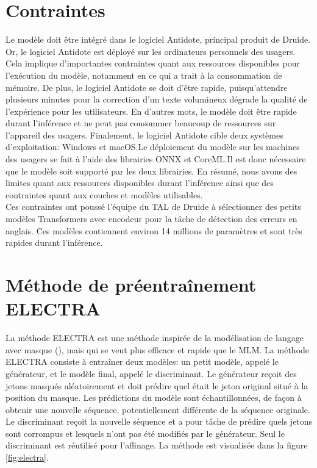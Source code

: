 \documentclass[12pt,twoside,rapport]{dms}
\theoremstyle{definition}
\numberwithin{equation}{section}
\numberwithin{table}{chapter}
\numberwithin{figure}{chapter}
\begin{document}
\section{Contraintes}
Le modèle doit être intégré dans le logiciel Antidote, principal produit de
Druide. Or, le logiciel Antidote est déployé sur les ordinateurs personnels des
usagers. Cela implique d'importantes contraintes quant aux ressources
disponibles pour l'exécution du modèle, notamment en ce qui a trait à la
consommation de mémoire. De plus, le logiciel Antidote se doit d'être rapide,
puisqu'attendre plusieurs minutes pour la correction d'un texte volumineux
dégrade la qualité de l'expérience pour les utilisateurs. En d'autres mots, le
modèle doit être rapide durant l'inférence et ne peut pas consommer beaucoup de
ressources sur l'appareil des usagers. Finalement, le logiciel Antidote cible
deux systèmes d'exploitation: Windows et macOS.\@ Le déploiement du modèle sur
les machines des usagers se fait à l'aide des librairies ONNX\cite{onnxruntime}
et CoreML.\@ Il est donc nécessaire que le modèle soit supporté par les deux
librairies. En résumé, nous avons des limites quant aux ressources disponibles
durant l'inférence ainsi que des contraintes quant aux couches et modèles
utilisables.\\

Ces contraintes ont poussé l'équipe du TAL de Druide à sélectionner des petits
modèles Transformers\cite{vaswani2023attentionneed} avec encodeur pour la tâche
de détection des erreurs en anglais. Ces modèles contiennent environ 14
millions de paramètres et sont très rapides durant l'inférence.

\section{Méthode de préentraînement ELECTRA}

La méthode ELECTRA\cite{clark2020electrapretrainingtextencoders} est une
méthode inspirée de la modélisation de langage avec masque (), mais
qui se veut plus efficace et rapide que le MLM. La méthode ELECTRA consiste à
entraîner deux modèles: un petit modèle, appelé le générateur, et le modèle
final, appelé le discriminant. Le générateur reçoit des jetons masqués
aléatoirement et doit prédire quel était le jeton original situé à la position
du masque. Les prédictions du modèle sont échantillonnées, de façon à obtenir
une nouvelle séquence, potentiellement différente de la séquence originale. Le
discriminant reçoit la nouvelle séquence et a pour tâche de prédire quels
jetons sont corrompus et lesquels n'ont pas été modifiés par le générateur.
Seul le discriminant est réutilisé pour l'affinage. La méthode est visualisée
dans la figure \ref{fig:electra}.
\\
\end{document}
